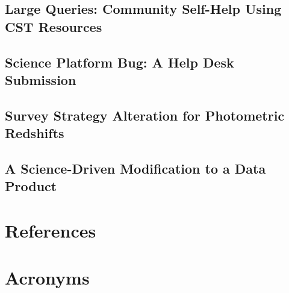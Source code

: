\documentclass[DM,lsstdraft,authoryear,toc]{lsstdoc}
\begin{document}
\clearpage
\subsection{Large Queries: Community Self-Help Using CST Resources}


\clearpage
\subsection{Science Platform Bug: A Help Desk Submission}


\clearpage
\subsection{Survey Strategy Alteration for Photometric Redshifts}


\clearpage
\subsection{A Science-Driven Modification to a Data Product}




\appendix
\section{References} \label{sec:bib}
\renewcommand{\refname}{} %


\section{Acronyms} \label{sec:acronyms}

\end{document}
